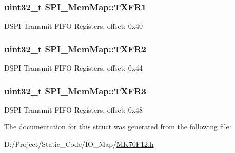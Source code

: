\subsubsection[{T\+X\+F\+R1}]{\setlength{\rightskip}{0pt plus 5cm}uint32\+\_\+t S\+P\+I\+\_\+\+Mem\+Map\+::\+T\+X\+F\+R1}\label{struct_s_p_i___mem_map_aa4c8bc4c6c43cb03d266084ead4948f6}
D\+S\+P\+I Transmit F\+I\+F\+O Registers, offset\+: 0x40 \hypertarget{struct_s_p_i___mem_map_a2e65235ded22e36d3dae2b17f172a32b}{}
\subsubsection[{T\+X\+F\+R2}]{\setlength{\rightskip}{0pt plus 5cm}uint32\+\_\+t S\+P\+I\+\_\+\+Mem\+Map\+::\+T\+X\+F\+R2}\label{struct_s_p_i___mem_map_a2e65235ded22e36d3dae2b17f172a32b}
D\+S\+P\+I Transmit F\+I\+F\+O Registers, offset\+: 0x44 \hypertarget{struct_s_p_i___mem_map_a817203724ca73f53cc544f887eeabd27}{}
\subsubsection[{T\+X\+F\+R3}]{\setlength{\rightskip}{0pt plus 5cm}uint32\+\_\+t S\+P\+I\+\_\+\+Mem\+Map\+::\+T\+X\+F\+R3}\label{struct_s_p_i___mem_map_a817203724ca73f53cc544f887eeabd27}
D\+S\+P\+I Transmit F\+I\+F\+O Registers, offset\+: 0x48 

The documentation for this struct was generated from the following file\+:\begin{DoxyCompactItemize}
\item 
D\+:/\+Project/\+Static\+\_\+\+Code/\+I\+O\+\_\+\+Map/\hyperlink{_m_k70_f12_8h}{M\+K70\+F12.\+h}\end{DoxyCompactItemize}
